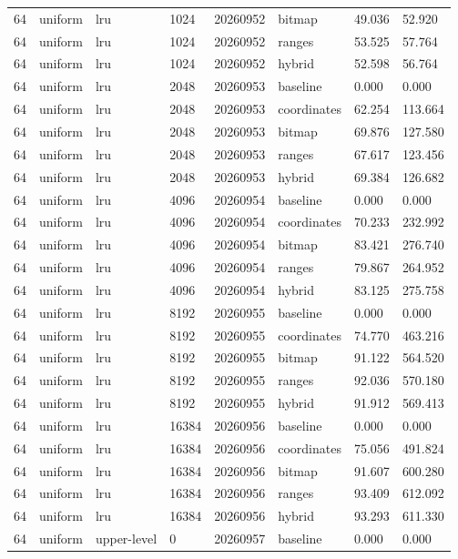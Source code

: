 \begin{tabular}{llllllll}
64 & uniform & lru & 1024 & 20260952 & bitmap & 49.036 & 52.920 \\
64 & uniform & lru & 1024 & 20260952 & ranges & 53.525 & 57.764 \\
64 & uniform & lru & 1024 & 20260952 & hybrid & 52.598 & 56.764 \\
64 & uniform & lru & 2048 & 20260953 & baseline & 0.000 & 0.000 \\
64 & uniform & lru & 2048 & 20260953 & coordinates & 62.254 & 113.664 \\
64 & uniform & lru & 2048 & 20260953 & bitmap & 69.876 & 127.580 \\
64 & uniform & lru & 2048 & 20260953 & ranges & 67.617 & 123.456 \\
64 & uniform & lru & 2048 & 20260953 & hybrid & 69.384 & 126.682 \\
64 & uniform & lru & 4096 & 20260954 & baseline & 0.000 & 0.000 \\
64 & uniform & lru & 4096 & 20260954 & coordinates & 70.233 & 232.992 \\
64 & uniform & lru & 4096 & 20260954 & bitmap & 83.421 & 276.740 \\
64 & uniform & lru & 4096 & 20260954 & ranges & 79.867 & 264.952 \\
64 & uniform & lru & 4096 & 20260954 & hybrid & 83.125 & 275.758 \\
64 & uniform & lru & 8192 & 20260955 & baseline & 0.000 & 0.000 \\
64 & uniform & lru & 8192 & 20260955 & coordinates & 74.770 & 463.216 \\
64 & uniform & lru & 8192 & 20260955 & bitmap & 91.122 & 564.520 \\
64 & uniform & lru & 8192 & 20260955 & ranges & 92.036 & 570.180 \\
64 & uniform & lru & 8192 & 20260955 & hybrid & 91.912 & 569.413 \\
64 & uniform & lru & 16384 & 20260956 & baseline & 0.000 & 0.000 \\
64 & uniform & lru & 16384 & 20260956 & coordinates & 75.056 & 491.824 \\
64 & uniform & lru & 16384 & 20260956 & bitmap & 91.607 & 600.280 \\
64 & uniform & lru & 16384 & 20260956 & ranges & 93.409 & 612.092 \\
64 & uniform & lru & 16384 & 20260956 & hybrid & 93.293 & 611.330 \\
64 & uniform & upper-level & 0 & 20260957 & baseline & 0.000 & 0.000 \\

\end{tabular}
